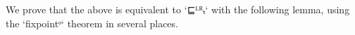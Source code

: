 \begin{code}
\AgdaSymbol{(}\AgdaSpace{}%
\AgdaSpace{}%
\AgdaSpace{}%
\AgdaSpace{}%
\AgdaSpace{}%
\AgdaSpace{}%
\AgdaSymbol{)))}\<%
\\
\>[0]\AgdaSpace{}%
\AgdaSpace{}%
\AgdaSpace{}%
\AgdaSpace{}%
\AgdaSpace{}%
\AgdaSymbol{=}\<%
\\
\>[0][@{}l@{\AgdaIndent{0}}]%
\>[3]\AgdaSymbol{(}\AgdaFunction{∃ᵒ[}\AgdaSpace{}%
\AgdaSpace{}%
\AgdaFunction{]}\AgdaSpace{}%
\AgdaSymbol{(}\AgdaSpace{}%
\AgdaSpace{}%
\AgdaSymbol{)}\AgdaSpace{}%
\AgdaSpace{}%
\AgdaSpace{}%
\AgdaSymbol{(}\AgdaSpace{}%
\AgdaSpace{}%
\AgdaSpace{}%
\AgdaSpace{}%
\AgdaSpace{}%
\AgdaSpace{}%
\AgdaSymbol{))}\<%
\\
%
\>[3]\AgdaSpace{}%
\AgdaSymbol{(}\AgdaSpace{}%
\AgdaSymbol{)}\<%
\\
%
\>[3]\AgdaSpace{}%
\AgdaSymbol{((}\AgdaSpace{}%
\AgdaSymbol{)}\AgdaSpace{}%
\AgdaSpace{}%
\AgdaSymbol{(}\AgdaFunction{∃ᵒ[}\AgdaSpace{}%
\AgdaSpace{}%
\AgdaFunction{]}\AgdaSpace{}%
\AgdaSymbol{(}\AgdaSpace{}%
\AgdaSpace{}%
\AgdaSymbol{)}\AgdaSpace{}%
\AgdaSpace{}%
\AgdaSymbol{(}\AgdaSpace{}%
\AgdaSymbol{)}\AgdaSpace{}%
\AgdaSpace{}%
\AgdaSymbol{(}\AgdaSpace{}%
\AgdaSpace{}%
\AgdaSpace{}%
\AgdaSpace{}%
\AgdaSpace{}%
\AgdaSpace{}%
\AgdaSymbol{)))}\<%
\end{code}

We prove that the above is equivalent to `⊑ᴸᴿₜ` with the following lemma,
using the `fixpointᵒ` theorem in several places.

